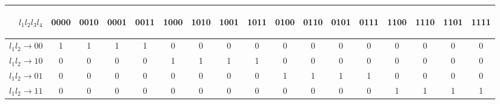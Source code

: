 \begin{table}[!ht]
\centering
\begin{tabular}{ r || c | c | c | c | c | c | c | c | c | c | c | c | c | c | c | c }
		\begin{sideways}$l_1 l_2 l_3 l_4$\end{sideways} &	\begin{sideways}0000\end{sideways} & \begin{sideways}0010\end{sideways} & \begin{sideways}0001\end{sideways} & \begin{sideways}0011\end{sideways}
			  & \begin{sideways}1000\end{sideways} & \begin{sideways}1010\end{sideways} & \begin{sideways}1001\end{sideways} & \begin{sideways}1011\end{sideways}
			  &	\begin{sideways}0100\end{sideways} & \begin{sideways}0110\end{sideways} & \begin{sideways}0101\end{sideways} & \begin{sideways}0111\end{sideways}
			  &	\begin{sideways}1100\end{sideways} & \begin{sideways}1110\end{sideways} & \begin{sideways}1101\end{sideways} & \begin{sideways}1111\end{sideways}\\ \hline \hline
    $l_1 l_2 \rightarrow 00$ & 1 & 1 & 1 & 1 & 0 & 0 & 0 & 0 & 0 & 0 & 0 & 0 & 0 & 0 & 0 & 0\\ \hline
    $l_1 l_2 \rightarrow 10$ & 0 & 0 & 0 & 0 & 1 & 1 & 1 & 1 & 0 & 0 & 0 & 0 & 0 & 0 & 0 & 0\\ \hline
    $l_1 l_2 \rightarrow 01$ & 0 & 0 & 0 & 0 & 0 & 0 & 0 & 0 & 1 & 1 & 1 & 1 &  0 & 0 & 0 & 0\\ \hline
    $l_1 l_2 \rightarrow 11$ & 0 & 0 & 0 & 0 & 0 & 0 & 0 & 0 & 0 & 0 & 0 & 0 & 1 & 1 & 1 & 1\\ \hline


\end{tabular}
\end{table}
